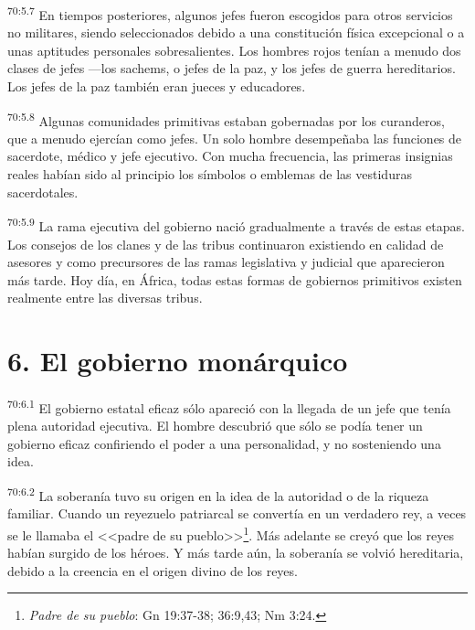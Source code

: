 \documentclass[twoside, 11pt]{book}
\begin{document}
\par
\textsuperscript{70:5.7} En tiempos posteriores, algunos jefes fueron escogidos para otros servicios no militares, siendo seleccionados debido a una constitución física excepcional o a unas aptitudes personales sobresalientes. Los hombres rojos tenían a menudo dos clases de jefes ---los sachems, o jefes de la paz, y los jefes de guerra hereditarios. Los jefes de la paz también eran jueces y educadores.

\par
\textsuperscript{70:5.8} Algunas comunidades primitivas estaban gobernadas por los curanderos, que a menudo ejercían como jefes. Un solo hombre desempeñaba las funciones de sacerdote, médico y jefe ejecutivo. Con mucha frecuencia, las primeras insignias reales habían sido al principio los símbolos o emblemas de las vestiduras sacerdotales.

\par
\textsuperscript{70:5.9} La rama ejecutiva del gobierno nació gradualmente a través de estas etapas. Los consejos de los clanes y de las tribus continuaron existiendo en calidad de asesores y como precursores de las ramas legislativa y judicial que aparecieron más tarde. Hoy día, en África, todas estas formas de gobiernos primitivos existen realmente entre las diversas tribus.

\section*{6. El gobierno monárquico}
\par
\textsuperscript{70:6.1} El gobierno estatal eficaz sólo apareció con la llegada de un jefe que tenía plena autoridad ejecutiva. El hombre descubrió que sólo se podía tener un gobierno eficaz confiriendo el poder a una personalidad, y no sosteniendo una idea.

\par
\textsuperscript{70:6.2} La soberanía tuvo su origen en la idea de la autoridad o de la riqueza familiar. Cuando un reyezuelo patriarcal se convertía en un verdadero rey, a veces se le llamaba el <<padre de su pueblo>>\footnote{\textit{Padre de su pueblo}: Gn 19:37-38; 36:9,43; Nm 3:24.}. Más adelante se creyó que los reyes habían surgido de los héroes. Y más tarde aún, la soberanía se volvió hereditaria, debido a la creencia en el origen divino de los reyes.
\end{document}
